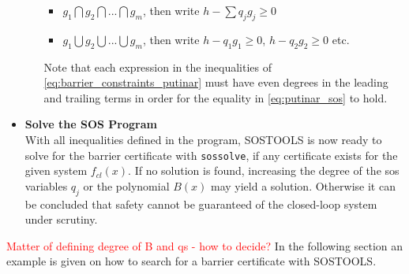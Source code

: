 \begin{itemize}
\begin{itemize}
	\begin{itemize}
		\item $g_1 \bigcap g_2 \bigcap ... \bigcap g_m$, then write $h - \sum q_jg_j\geq 0$
		\item $g_1 \bigcup g_2 \bigcup ... \bigcup g_m$, then write $h - q_1g_1\geq 0$, $h - q_2g_2\geq 0$ etc.
	\end{itemize} 
	Note that each expression in the inequalities of \autoref{eq:barrier_constraints_putinar} must have even degrees in the leading and trailing terms in order for the equality in \autoref{eq:putinar_sos} to hold.
\end{itemize}
\item \textbf{Solve the SOS Program}\\
With all inequalities defined in the program, SOSTOOLS is now ready to solve for the barrier certificate with \texttt{sossolve}, if any certificate exists for the given system $f_{cl}(x)$. If no solution is found, increasing the degree of the \gls{sos} variables $q_j$ or the polynomial $B(x)$ may yield a solution. Otherwise it can be concluded that safety cannot be guaranteed of the closed-loop system under scrutiny. 
\end{itemize}





\textcolor{red}{Matter of defining degree of B and qs - how to decide?}
In the following section an example is given on how to search for a barrier certificate with SOSTOOLS.











